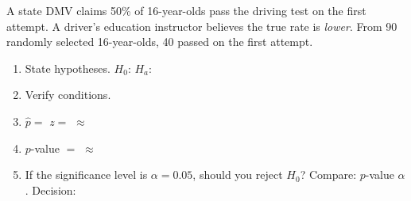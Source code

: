 \documentclass[10pt]{article}
\begin{document}
\namedateperiod

\vspace{0.15in}

A state DMV claims 50\% of 16-year-olds pass the driving test on the first attempt.
A driver's education instructor believes the true rate is \emph{lower}. From 90 randomly
selected 16-year-olds, 40 passed on the first attempt.

\begin{enumerate}
  \item State hypotheses. $H_0$: \blank{4cm} \quad $H_a$: \blank{4cm}

  \item Verify conditions. 

  \item $\hat p = $ \blank{2cm} \quad $z = $ \blank{5cm} $\approx $ \blank{2cm}

  \item $p$-value $=$ \blank{4cm} $\approx$ \blank{2cm}

  \item If the significance level is $\alpha = 0.05$, should you reject $H_0$?
        Compare: $p$-value \blank{2cm} $\alpha$. Decision: \blank{4cm}
\end{enumerate}
\end{document}
